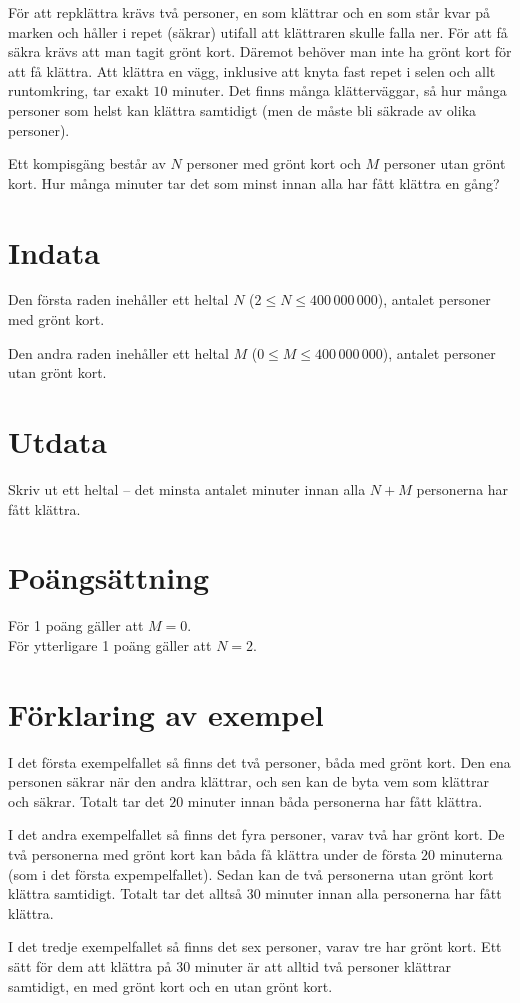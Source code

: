För att repklättra krävs två personer, en som klättrar och en som står kvar på marken och håller i repet (säkrar) utifall att klättraren skulle falla ner.
För att få säkra krävs att man tagit grönt kort.
Däremot behöver man inte ha grönt kort för att få klättra.
Att klättra en vägg, inklusive att knyta fast repet i selen och allt runtomkring, tar exakt $10$ minuter.
Det finns många klätterväggar, så hur många personer som helst kan klättra samtidigt (men de måste bli säkrade av olika personer).

Ett kompisgäng består av $N$ personer med grönt kort och $M$ personer utan grönt kort. Hur många minuter tar det som minst innan alla har fått klättra en gång?

\section*{Indata}
Den första raden inehåller ett heltal $N$ ($2 \le N \le 400\,000\,000$), antalet personer med grönt kort.

Den andra raden inehåller ett heltal $M$ ($0 \le M \le 400\,000\,000$), antalet personer utan grönt kort.


\section*{Utdata}
Skriv ut ett heltal -- det minsta antalet minuter innan alla $N+M$ personerna har fått klättra.

\section*{Poängsättning}
För 1 poäng gäller att $M = 0$. \\
För ytterligare 1 poäng gäller att $N = 2$.

\section*{Förklaring av exempel}
I det första exempelfallet så finns det två personer, båda med grönt kort.
Den ena personen säkrar när den andra klättrar, och sen kan de byta vem som klättrar och säkrar. 
Totalt tar det $20$ minuter innan båda personerna har fått klättra.

I det andra exempelfallet så finns det fyra personer, varav två har grönt kort.
De två personerna med grönt kort kan båda få klättra under de första $20$ minuterna (som i det första expempelfallet).
Sedan kan de två personerna utan grönt kort klättra samtidigt.
Totalt tar det alltså $30$ minuter innan alla personerna har fått klättra.

I det tredje exempelfallet så finns det sex personer, varav tre har grönt kort.
Ett sätt för dem att klättra på $30$ minuter är att alltid två personer klättrar samtidigt, en med grönt kort och en utan grönt kort.
